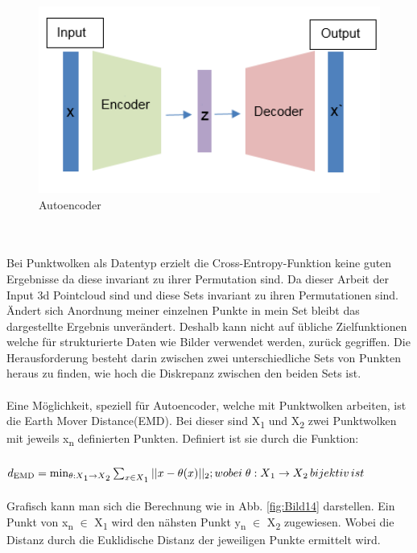 \documentclass{llncs}
\begin{document}
\begin{figure}[htbp] 
	\centering
	\includegraphics[width=1.0\textwidth]{autoencoder2.png}
	\caption{Autoencoder}
	\label{fig:Bild13}
\end{figure}
~\\\\
Bei Punktwolken als Datentyp erzielt die Cross-Entropy-Funktion keine guten Ergebnisse da diese invariant zu ihrer Permutation sind. Da dieser Arbeit der Input 3d Pointcloud sind und diese Sets  invariant zu ihren Permutationen sind. Ändert sich Anordnung meiner einzelnen Punkte in mein Set bleibt das dargestellte Ergebnis unverändert.  Deshalb kann nicht auf übliche Zielfunktionen welche für strukturierte Daten wie Bilder verwendet werden, zurück gegriffen. Die Herausforderung besteht darin zwischen zwei unterschiedliche Sets von Punkten heraus zu finden, wie hoch die Diskrepanz zwischen den beiden Sets ist\cite{invariant}. 
\\\\
Eine Möglichkeit, speziell für Autoencoder, welche mit Punktwolken arbeiten, ist die Earth Mover Distance(EMD). Bei dieser sind X\textsubscript{1} und X\textsubscript{2} zwei Punktwolken mit jeweils x\textsubscript{n} definierten Punkten\cite{autoencoderloss}. Definiert ist sie durch die Funktion:
\\\\
\begin{math}
d\textsubscript{EMD}=\min_{\theta : X\textsubscript{1}\rightarrow X\textsubscript{2}}  \sum_{x\in X\textsubscript{1}}|| x - \theta(x)||\textsubscript{2};wobei\;\theta: X\textsubscript{1} \rightarrow X\textsubscript{2}\, bijektiv\, ist 
\end{math}
\\\\
Grafisch kann man sich die Berechnung wie in Abb. \ref{fig:Bild14} darstellen. Ein Punkt von x\textsubscript{n} $\in$ X\textsubscript{1} wird den nähsten Punkt y\textsubscript{n} $\in$  X\textsubscript{2} zugewiesen. Wobei die Distanz durch die Euklidische Distanz der jeweiligen Punkte ermittelt wird. 
\end{document}
